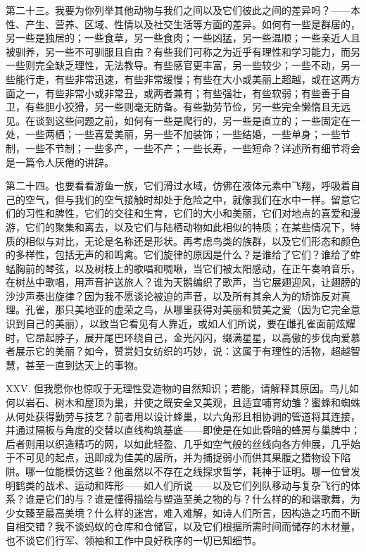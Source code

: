 第二十三。我要为你列举其他动物与我们之间以及它们彼此之间的差异吗？——本性、产生、营养、区域、性情以及社交生活等方面的差异。如何有一些是群居的，另一些是独居的；一些食草，另一些食肉；一些凶猛，另一些温顺；一些亲近人且被驯养，另一些不可驯服且自由？有些我们可称之为近乎有理性和学习能力，而另一些则完全缺乏理性，无法教导。有些感官更丰富，另一些较少；一些不动，另一些能行走，有些非常迅速，有些非常缓慢；有些在大小或美丽上超越，或在这两方面之一，有些非常小或非常丑，或两者兼有；有些强壮，有些软弱；有些善于自卫，有些胆小狡猾，另一些则毫无防备。有些勤劳节俭，另一些完全懒惰且无远见。在谈到这些问题之前，如何有一些是爬行的，另一些是直立的；一些固定在一处，一些两栖；一些喜爱美丽，另一些不加装饰；一些结婚，一些单身；一些节制，一些不节制；一些多产，一些不产；一些长寿，一些短命？详述所有细节将会是一篇令人厌倦的讲辞。\par

第二十四。也要看看游鱼一族，它们滑过水域，仿佛在液体元素中飞翔，呼吸着自己的空气，但与我们的空气接触时却处于危险之中，就像我们在水中一样。留意它们的习性和脾性，它们的交往和生育，它们的大小和美丽，它们对地点的喜爱和漫游，它们的聚集和离去，以及它们与陆栖动物如此相似的特质；在某些情况下，特质的相似与对比，无论是名称还是形状。再考虑鸟类的族群，以及它们形态和颜色的多样性，包括无声的和鸣禽。它们旋律的原因是什么？是谁给了它们？谁给了蚱蜢胸前的琴弦，以及树枝上的歌唱和啁啾，当它们被太阳感动，在正午奏响音乐，在树丛中歌唱，用声音护送旅人？谁为天鹅编织了歌声，当它展翅迎风，让翅膀的沙沙声奏出旋律？因为我不愿谈论被迫的声音，以及所有其余人为的矫饰反对真理。孔雀，那只美地亚的虚荣之鸟，从哪里获得对美丽和赞美之爱（因为它完全意识到自己的美丽），以致当它看见有人靠近，或如人们所说，要在雌孔雀面前炫耀时，它昂起脖子，展开尾巴环绕自己，金光闪闪，缀满星星，以高傲的步伐向爱慕者展示它的美丽？如今，赞赏妇女纺织的巧妙，说：这属于有理性的活物，超越智慧，甚至一直到达天上的事物。\par

XXV. 但我愿你也惊叹于无理性受造物的自然知识；若能，请解释其原因。鸟儿如何以岩石、树木和屋顶为巢，并使之既安全又美观，且适宜哺育幼雏？蜜蜂和蜘蛛从何处获得勤劳与技艺？前者用以设计蜂巢，以六角形且相协调的管道将其连接，并通过隔板与角度的交替以直线构筑基底——即使是在如此昏暗的蜂房与巢脾中；后者则用以织造精巧的网，以如此轻盈、几乎如空气般的丝线向各方伸展，几乎始于不可见的起点，迅即成为佳美的居所，并为捕捉弱小而供其果腹之猎物设下陷阱。哪一位能模仿这些？他虽然以不存在之线探求哲学，耗神于证明。哪一位曾发明鹤类的战术、运动和阵形——如人们所说——以及它们列队移动与复杂飞行的体系？谁是它们的与？谁是懂得描绘与塑造至美之物的与？什么样的的和谐歌舞，为少女臻至最高美境？什么样的迷宫，难入难解，如诗人们所言，因构造之巧而不断自相交错？我不谈蚂蚁的仓库和仓储官，以及它们根据所需时间而储存的木材量，也不谈它们行军、领袖和工作中良好秩序的一切已知细节。\par

